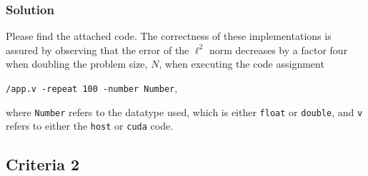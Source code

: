 \documentclass[10pt]{article}
\begin{document}
\subsubsection{Solution}
Please find the attached code. The correctness of these implementations is assured by observing that the error of the $\ell^2$ norm decreases by a factor four when doubling the problem size, $N$, when executing the code assignment
\begin{center}
    \texttt{/app.v -repeat 100 -number Number},
\end{center}
where \texttt{Number} refers to the datatype used, which is either \texttt{float} or \texttt{double}, and \texttt{v} refers to either the \texttt{host} or \texttt{cuda} code.
\subsection{Criteria 2}
\end{document}
